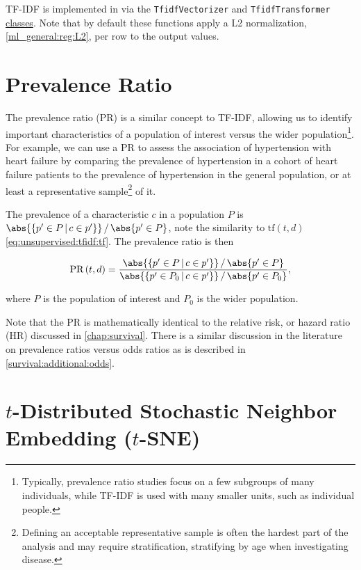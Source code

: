 TF-IDF is implemented
in \sklearn via the \texttt{TfidfVectorizer} and
\newline %
\texttt{TfidfTransformer}
\href{https://scikit-learn.org/stable/modules/generated/sklearn.feature_extraction.text.TfidfVectorizer.html}{classes}.
Note that by default these functions
apply a L2 normalization, \cref{ml_general:reg:L2},
per row to the output values.

\section{Prevalence Ratio}
\label{dim_reduct:prevalence_ratio}

The prevalence ratio (PR) is a similar concept to TF-IDF,
allowing us to identify important characteristics
of a population of interest versus the wider population\footnote{Typically,
prevalence ratio studies focus on a few subgroups of many individuals,
while TF-IDF is used with many smaller units, such as individual people.}.
For example, we can use a PR to assess the association of hypertension with heart failure by comparing
the prevalence of hypertension in a cohort of heart failure patients
to the prevalence of hypertension in the general population,
or at least a representative sample\footnote{Defining an acceptable representative sample is often the hardest part of the analysis and may require stratification, \eg stratifying by age when investigating disease.} of it.

The prevalence of a characteristic $c$ in a population $P$ is $\abs{\{p' \in P \, | \, c \in p'\}} \, / \, \abs{p' \in P}$,
note the similarity to $\text{tf}\left(t,d\right)$ \cref{eq:unsupervised:tfidf:tf}.
The prevalence ratio is then

\begin{equation}\label{eq:unsupervised:PR}
\text{PR}\left(t,d\right) = \frac{ \abs{\{p' \in P \, | \, c \in p'\}} \, / \, \abs{p' \in P} }{ \abs{\{p' \in P_{0} \, | \, c \in p'\}} \, / \, \abs{p' \in P_{0}} },
\end{equation}

\noindent where $P$ is the population of interest and $P_{0}$ is the wider population.

Note that the PR is mathematically identical to the relative risk, or hazard ratio (HR) discussed in \cref{chap:survival}.
There is a similar discussion in the literature \cite{pmid27460748,10.3389/fvets.2017.00193}
on prevalence ratios versus odds ratios as is described in \cref{survival:additional:odds}.


\section{\texorpdfstring{$t$}{t}-Distributed Stochastic Neighbor Embedding (\texorpdfstring{$t$}{t}-SNE)}
\label{dim_reduct:tSNE}
